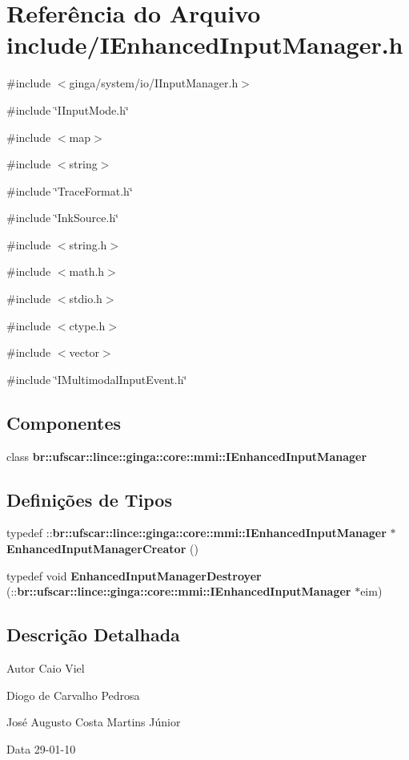 \section{Referência do Arquivo include/IEnhancedInputManager.h}
\label{IEnhancedInputManager_8h}
{\ttfamily \#include $<$ginga/system/io/IInputManager.h$>$}\par
{\ttfamily \#include \char`\"{}IInputMode.h\char`\"{}}\par
{\ttfamily \#include $<$map$>$}\par
{\ttfamily \#include $<$string$>$}\par
{\ttfamily \#include \char`\"{}TraceFormat.h\char`\"{}}\par
{\ttfamily \#include \char`\"{}InkSource.h\char`\"{}}\par
{\ttfamily \#include $<$string.h$>$}\par
{\ttfamily \#include $<$math.h$>$}\par
{\ttfamily \#include $<$stdio.h$>$}\par
{\ttfamily \#include $<$ctype.h$>$}\par
{\ttfamily \#include $<$vector$>$}\par
{\ttfamily \#include \char`\"{}IMultimodalInputEvent.h\char`\"{}}\par
\subsection*{Componentes}
\begin{DoxyCompactItemize}
\item 
class {\bf br::ufscar::lince::ginga::core::mmi::IEnhancedInputManager}
\end{DoxyCompactItemize}
\subsection*{Definições de Tipos}
\begin{DoxyCompactItemize}
\item 
typedef ::{\bf br::ufscar::lince::ginga::core::mmi::IEnhancedInputManager} $\ast$ {\bf EnhancedInputManagerCreator} ()
\item 
typedef void {\bf EnhancedInputManagerDestroyer} (::{\bf br::ufscar::lince::ginga::core::mmi::IEnhancedInputManager} $\ast$eim)
\end{DoxyCompactItemize}


\subsection{Descrição Detalhada}
\begin{DoxyAuthor}{Autor}
Caio Viel 

Diogo de Carvalho Pedrosa 

José Augusto Costa Martins Júnior 
\end{DoxyAuthor}
\begin{DoxyDate}{Data}
29-\/01-\/10 
\end{DoxyDate}


